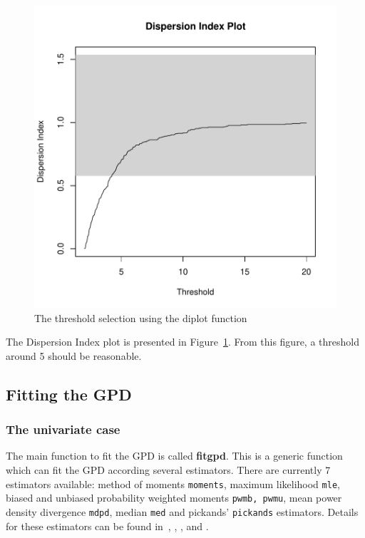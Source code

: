 \documentclass[a4paper]{article}
\numberwithin{equation}{section}
\theoremstyle{definition}
\begin{document}
\begin{figure}
\centering
\includegraphics{guide-012}
\caption{The threshold selection using the diplot function}
\label{fig:diplot}
\end{figure}

The Dispersion Index plot is presented in
Figure~\ref{fig:diplot}. From this figure, a threshold around 5 should
be reasonable.

\subsection{Fitting the GPD}
\label{subsec:fitGPD}

\subsubsection{The univariate case}

The main function to fit the GPD is called \textbf{fitgpd}. This is a
generic function which can fit the GPD according several
estimators. There are currently 7 estimators available: method of
moments \verb|moments|, maximum likelihood \verb|mle|, biased and
unbiased probability weighted moments \verb|pwmb, pwmu|, mean power
density divergence \verb|mdpd|, median \verb|med| and pickands'
\verb|pickands| estimators. Details for these estimators can be found
in~\citep{Coles2001}, \citep{Hosking1987}, \citep{Juarez2004},
\citep{Peng2001} and \citep{Pickands1975}.
\end{document}
